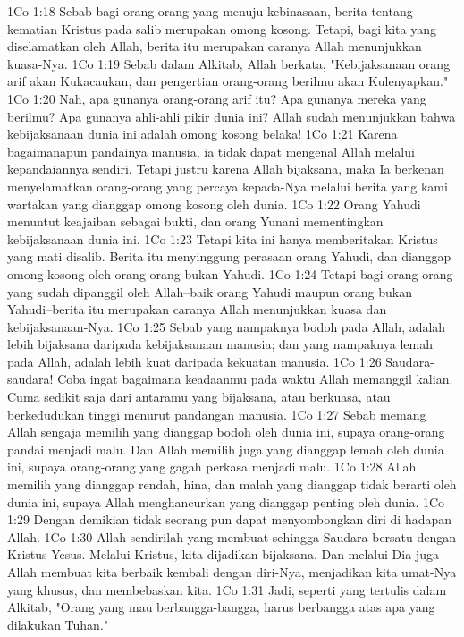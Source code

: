 1Co 1:18  Sebab bagi orang-orang yang menuju kebinasaan, berita tentang kematian Kristus pada salib merupakan omong kosong. Tetapi, bagi kita yang diselamatkan oleh Allah, berita itu merupakan caranya Allah menunjukkan kuasa-Nya.
1Co 1:19  Sebab dalam Alkitab, Allah berkata, "Kebijaksanaan orang arif akan Kukacaukan, dan pengertian orang-orang berilmu akan Kulenyapkan."
1Co 1:20  Nah, apa gunanya orang-orang arif itu? Apa gunanya mereka yang berilmu? Apa gunanya ahli-ahli pikir dunia ini? Allah sudah menunjukkan bahwa kebijaksanaan dunia ini adalah omong kosong belaka!
1Co 1:21  Karena bagaimanapun pandainya manusia, ia tidak dapat mengenal Allah melalui kepandaiannya sendiri. Tetapi justru karena Allah bijaksana, maka Ia berkenan menyelamatkan orang-orang yang percaya kepada-Nya melalui berita yang kami wartakan yang dianggap omong kosong oleh dunia.
1Co 1:22  Orang Yahudi menuntut keajaiban sebagai bukti, dan orang Yunani mementingkan kebijaksanaan dunia ini.
1Co 1:23  Tetapi kita ini hanya memberitakan Kristus yang mati disalib. Berita itu menyinggung perasaan orang Yahudi, dan dianggap omong kosong oleh orang-orang bukan Yahudi.
1Co 1:24  Tetapi bagi orang-orang yang sudah dipanggil oleh Allah--baik orang Yahudi maupun orang bukan Yahudi--berita itu merupakan caranya Allah menunjukkan kuasa dan kebijaksanaan-Nya.
1Co 1:25  Sebab yang nampaknya bodoh pada Allah, adalah lebih bijaksana daripada kebijaksanaan manusia; dan yang nampaknya lemah pada Allah, adalah lebih kuat daripada kekuatan manusia.
1Co 1:26  Saudara-saudara! Coba ingat bagaimana keadaanmu pada waktu Allah memanggil kalian. Cuma sedikit saja dari antaramu yang bijaksana, atau berkuasa, atau berkedudukan tinggi menurut pandangan manusia.
1Co 1:27  Sebab memang Allah sengaja memilih yang dianggap bodoh oleh dunia ini, supaya orang-orang pandai menjadi malu. Dan Allah memilih juga yang dianggap lemah oleh dunia ini, supaya orang-orang yang gagah perkasa menjadi malu.
1Co 1:28  Allah memilih yang dianggap rendah, hina, dan malah yang dianggap tidak berarti oleh dunia ini, supaya Allah menghancurkan yang dianggap penting oleh dunia.
1Co 1:29  Dengan demikian tidak seorang pun dapat menyombongkan diri di hadapan Allah.
1Co 1:30  Allah sendirilah yang membuat sehingga Saudara bersatu dengan Kristus Yesus. Melalui Kristus, kita dijadikan bijaksana. Dan melalui Dia juga Allah membuat kita berbaik kembali dengan diri-Nya, menjadikan kita umat-Nya yang khusus, dan membebaskan kita.
1Co 1:31  Jadi, seperti yang tertulis dalam Alkitab, "Orang yang mau berbangga-bangga, harus berbangga atas apa yang dilakukan Tuhan."
